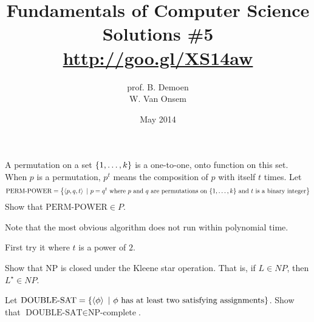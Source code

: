 \documentclass{article}
\title{Fundamentals of Computer Science\\Solutions \#5\\\url{http://goo.gl/XS14aw}}
\author{prof. B. Demoen\\W. Van Onsem}
\date{May 2014}
\begin{document}
\maketitle
\begin{exercise}
A permutation on a set $\left\{ 1,\ldots,k \right\}$ is a one-to-one, onto function on this set. When $p$ is a permutation, $p^t$ means the composition of $p$ with itself $t$ times. Let
\begin{equation}
\mbox{PERM-POWER}=\left\{ \left\langle p, q, t \right\rangle\ |\ p = q^t\mbox{ where $p$ and $q$ are permutations on $\left\{ 1,\ldots,k \right\}$ and $t$ is a binary integer} \right\}
\end{equation}
Show that $\mbox{PERM-POWER}\in P$.
\begin{note}
Note that the most obvious algorithm does not run within polynomial time.
\end{note}
\begin{hint}
First try it where $t$ is a power of $2$.
\end{hint}
\end{exercise}

\begin{exercise}
Show that NP is closed under the Kleene star operation. That is, if $L\in NP$, then $L^{\star}\in NP$.
\end{exercise}

\begin{exercise}
Let $\mbox{DOUBLE-SAT}=\left\{ \left\langle \phi \right\rangle\ |\ \phi\mbox{ has at least two satisfying assignments} \right\}$. Show that $\mbox{DOUBLE-SAT}\in\mbox{NP-complete}$.
\end{exercise}
\end{document}
